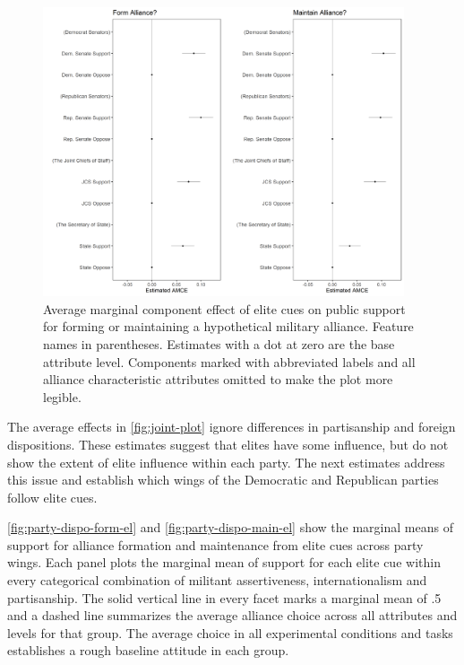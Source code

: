 \documentclass[12pt]{article}
\begin{document}
\begin{figure}[htpb]
	\centering
		\includegraphics[width=0.95\textwidth]{../figures/joint-amce-plots-el.png}
	\caption{Average marginal component effect of elite cues on public support for forming or maintaining a hypothetical military alliance. Feature names in parentheses. Estimates with a dot at zero are the base attribute level. Components marked with abbreviated labels and all alliance characteristic attributes omitted to make the plot more legible.}
	\label{fig:joint-plot}
\end{figure}


The average effects in \autoref{fig:joint-plot} ignore differences in partisanship and foreign dispositions.
These estimates suggest that elites have some influence, but do not show the extent of elite influence within each party. 
The next estimates address this issue and establish which wings of the Democratic and Republican parties follow elite cues. 


\autoref{fig:party-dispo-form-el} and \autoref{fig:party-dispo-main-el} show the marginal means of support for alliance formation and maintenance from elite cues across party wings.
Each panel plots the marginal mean of support for each elite cue within every categorical combination of militant assertiveness, internationalism and partisanship.
The solid vertical line in every facet marks a marginal mean of .5 and a dashed line summarizes the average alliance choice across all attributes and levels for that group.
The average choice in all experimental conditions and tasks establishes a rough baseline attitude in each group.  
\end{document}
